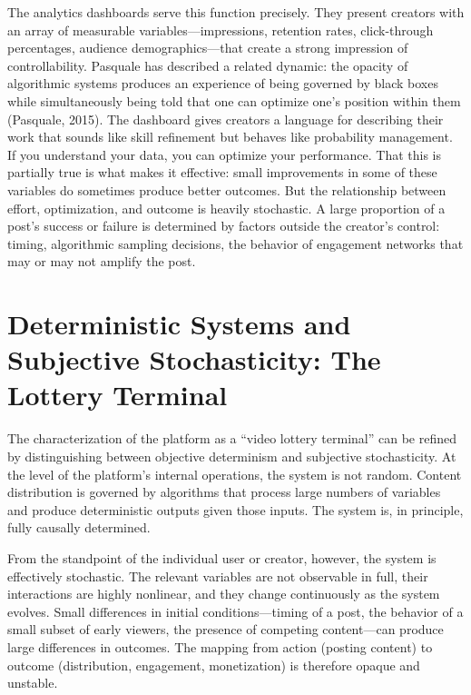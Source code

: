 \documentclass[12pt, a4paper]{article}
\begin{document}
The analytics dashboards serve this function precisely. They present creators with an array of measurable variables---impressions, retention rates, click-through percentages, audience demographics---that create a strong impression of controllability. Pasquale has described a related dynamic: the opacity of algorithmic systems produces an experience of being governed by black boxes while simultaneously being told that one can optimize one's position within them (Pasquale, 2015). The dashboard gives creators a language for describing their work that sounds like skill refinement but behaves like probability management. If you understand your data, you can optimize your performance. That this is partially true is what makes it effective: small improvements in some of these variables do sometimes produce better outcomes. But the relationship between effort, optimization, and outcome is heavily stochastic. A large proportion of a post's success or failure is determined by factors outside the creator's control: timing, algorithmic sampling decisions, the behavior of engagement networks that may or may not amplify the post.

\section{Deterministic Systems and Subjective Stochasticity: The Lottery Terminal}

The characterization of the platform as a ``video lottery terminal'' can be refined by distinguishing between objective determinism and subjective stochasticity. At the level of the platform's internal operations, the system is not random. Content distribution is governed by algorithms that process large numbers of variables and produce deterministic outputs given those inputs. The system is, in principle, fully causally determined.

From the standpoint of the individual user or creator, however, the system is effectively stochastic. The relevant variables are not observable in full, their interactions are highly nonlinear, and they change continuously as the system evolves. Small differences in initial conditions---timing of a post, the behavior of a small subset of early viewers, the presence of competing content---can produce large differences in outcomes. The mapping from action (posting content) to outcome (distribution, engagement, monetization) is therefore opaque and unstable.
\end{document}
